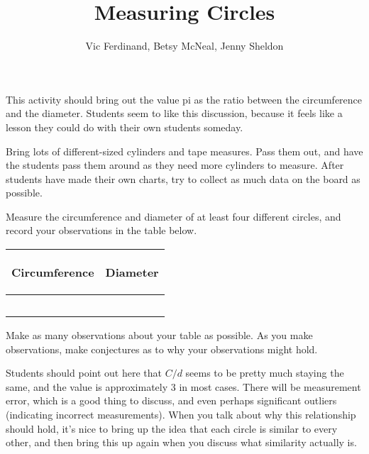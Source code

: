 \documentclass{ximera}
\title{Measuring Circles}
\author{Vic Ferdinand, Betsy McNeal, Jenny Sheldon}
\begin{document}
\begin{abstract}
\end{abstract}
\maketitle

\begin{instructorIntro}
This activity should bring out the value pi as the ratio between the circumference and the diameter.  Students seem to like this discussion, because it feels like a lesson they could do with their own students someday.

Bring lots of different-sized cylinders and tape measures.  Pass them out, and have the students pass them around as they need more cylinders to measure.  After students have made their own charts, try to collect as much data on the board as possible.

\end{instructorIntro}

\begin{problem} 
Measure the circumference and diameter of at least four different circles, and record your observations in the table below.
\vskip 0.1in
\begin{tabular}{|p{2.2in}|p{2.2in}|}
\hline
\begin{center} Circumference \end{center} & \begin{center} Diameter \end{center}  \\ \hline
 & \\ [5ex] \hline
 & \\ [5 ex] \hline
 & \\ [5 ex] \hline
 & \\ [5 ex] \hline
 & \\ [5 ex] \hline
\end{tabular}
\end{problem}

\begin{problem}
Make as many observations about your table as possible.  As you make observations, make conjectures as to why your observations might hold.
\begin{instructorNotes}
Students should point out here that $C/d$ seems to be pretty much staying the same, and the value is approximately 3 in most cases.  There will be measurement error, which is a good thing to discuss, and even perhaps significant outliers (indicating incorrect measurements).  When you talk about why this relationship should hold, it's nice to bring up the idea that each circle is similar to every other, and then bring this up again when you discuss what similarity actually is.
\end{instructorNotes}
\end{problem}
\end{document}
